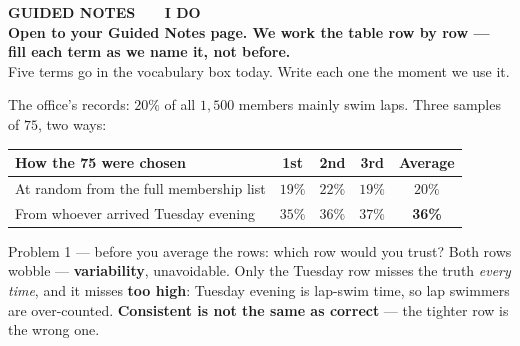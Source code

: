 \documentclass[aspectratio=169, 11pt]{beamer}
\newcommand{\redink}[1]{{\color{redacc}\bfseries #1}}
\begin{document}
{
\begin{frame}[plain]
  \vspace{1.8cm}\hspace{0.8cm}%
  \begin{minipage}{0.86\textwidth}
    {\color{goldacc}\bfseries\small GUIDED NOTES \ \textbullet\ \ I DO}\\[0.7cm]
    {\color{white}\bfseries\Large Open to your Guided Notes page. We work the table row by
    row --- fill each term as we name it, not before.}\\[0.9cm]
    {\color{frostmid}\small Five terms go in the vocabulary box today. Write each one the
    moment we use it.}
  \end{minipage}
\end{frame}
}

\begin{frame}[t, plain]
  \vspace{2pt}
  The office's records: $20\%$ of all $1{,}500$ members mainly swim laps. Three samples of $75$, two ways:
  \begin{center}
    \small
    \renewcommand{\arraystretch}{1.3}
    \begin{tabular}{@{} l c c c c @{}}
    \hline
    \textbf{How the 75 were chosen} & \textbf{1st} & \textbf{2nd} & \textbf{3rd} & \textbf{Average} \\
    \hline
    At random from the full membership list & $19\%$ & $22\%$ & $19\%$ & $20\%$ \\
    From whoever arrived Tuesday evening    & $35\%$ & $36\%$ & $37\%$ & \redink{36\%} \\
    \hline
    \end{tabular}
  \end{center}
  \vspace{4pt}
  \begin{block}{Problem 1 --- before you average the rows: which row would you trust?}
    Both rows wobble --- \textbf{variability}, unavoidable. Only the Tuesday row misses the truth
    \emph{every time}, and it misses \redink{too high}: Tuesday evening is lap-swim time, so lap
    swimmers are over-counted. \textbf{Consistent is not the same as correct} --- the tighter row
    is the wrong one.
  \end{block}
\end{frame}
\end{document}
